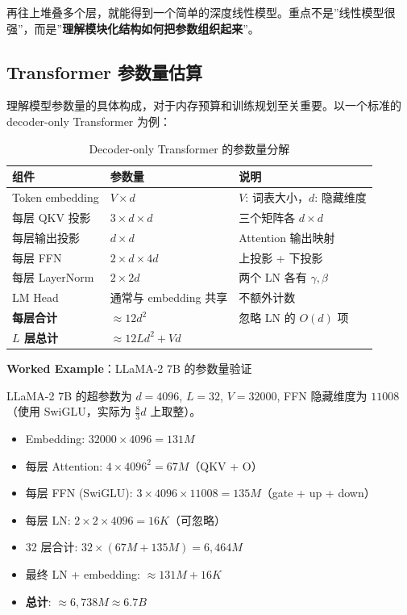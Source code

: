 再往上堆叠多个层，就能得到一个简单的深度线性模型。重点不是”线性模型很强”，而是”\textbf{理解模块化结构如何把参数组织起来}”。

\subsection{Transformer 参数量估算}

理解模型参数量的具体构成，对于内存预算和训练规划至关重要。以一个标准的 decoder-only Transformer 为例：

\begin{table}[H]
\centering
\begin{tabular}{p{}p{}p{}}
\toprule
\textbf{组件} & \textbf{参数量} & \textbf{说明} \\
\midrule
Token embedding & $V \times d$ & $V$: 词表大小，$d$: 隐藏维度 \\
每层 QKV 投影 & $3 \times d \times d$ & 三个矩阵各 $d \times d$ \\
每层输出投影 & $d \times d$ & Attention 输出映射 \\
每层 FFN & $2 \times d \times 4d$ & 上投影 + 下投影 \\
每层 LayerNorm & $2 \times 2d$ & 两个 LN 各有 $\gamma, \beta$ \\
LM Head & 通常与 embedding 共享 & 不额外计数 \\
\midrule
\textbf{每层合计} & $\approx 12d^2$ & 忽略 LN 的 $O(d)$ 项 \\
\textbf{$L$ 层总计} & $\approx 12Ld^2 + Vd$ & \\
\bottomrule
\end{tabular}
\caption{Decoder-only Transformer 的参数量分解}
\end{table}

\textbf{Worked Example}：LLaMA-2 7B 的参数量验证

LLaMA-2 7B 的超参数为 $d = 4096$, $L = 32$, $V = 32000$, FFN 隐藏维度为 $11008$（使用 SwiGLU，实际为 $\frac{8}{3}d$ 上取整）。

\begin{itemize}
    \item Embedding: $32000 \times 4096 = 131M$
    \item 每层 Attention: $4 \times 4096^2 = 67M$（QKV + O）
    \item 每层 FFN (SwiGLU): $3 \times 4096 \times 11008 = 135M$（gate + up + down）
    \item 每层 LN: $2 \times 2 \times 4096 = 16K$（可忽略）
    \item 32 层合计: $32 \times (67M + 135M) = 6,464M$
    \item 最终 LN + embedding: $\approx 131M + 16K$
    \item \textbf{总计}: $\approx 6,738M \approx 6.7B$
\end{itemize}

